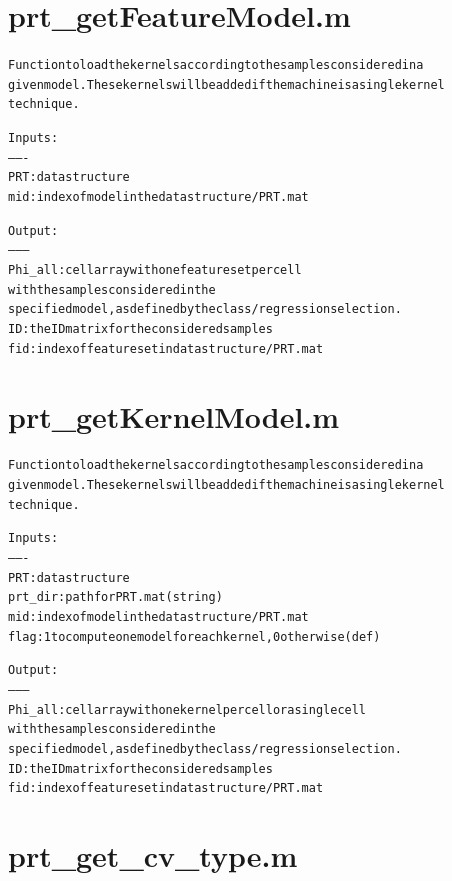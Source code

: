 \section{prt\_getFeatureModel.m}
\begin{alltt}

 Function to load the kernels according to the samples considered in a
given model. These kernels will be added if the machine is a single kernel
technique.
 
 Inputs:
 -------
 PRT:            data structure
 mid :           index of model in the data structure/ PRT.mat
 
 Output:
 --------
 Phi\_all :  cell array with one feature set per cell
            with the samples considered in the
            specified model, as defined by the class/regression selection.
 ID :       the ID matrix for the considered samples
 fid :      index of feature set in data structure / PRT.mat
 
\end{alltt}


\section{prt\_getKernelModel.m}
\begin{alltt}

 Function to load the kernels according to the samples considered in a
given model. These kernels will be added if the machine is a single kernel
technique.
 
 Inputs:
 -------
 PRT:            data structure
 prt\_dir:        path for PRT.mat (string)
 mid :           index of model in the data structure/ PRT.mat
 flag:           1 to compute one model for each kernel, 0 otherwise (def)
 
 Output:
 --------
 Phi\_all :  cell array with one kernel per cell or a single cell
            with the samples considered in the
            specified model, as defined by the class/regression selection.
 ID :       the ID matrix for the considered samples
 fid :      index of feature set in data structure / PRT.mat
 
\end{alltt}


\section{prt\_get\_cv\_type.m}
\begin{alltt}

\end{alltt}


